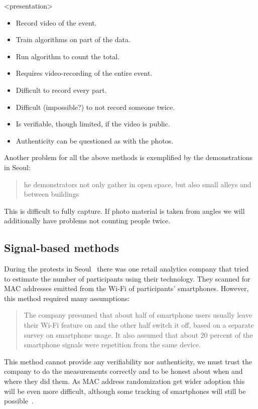 \begin{frame}<presentation>
  \begin{solution}
    \begin{itemize}
      \item Record video of the event.
      \item Train algorithms on part of the data.
      \item Run algorithm to count the total.
    \end{itemize}
  \end{solution}

  \pause

  \begin{remark}
    \begin{itemize}
      \item Requires video-recording of the entire event.
      \item Difficult to record every part.
      \item Difficult (impossible?) to not record someone twice.
      \item Is verifiable, though limited, if the video is public.
      \item Authenticity can be questioned as with the photos.
    \end{itemize}
  \end{remark}
\end{frame}

Another problem for all the above methods is exemplified by the demonstrations 
in Seoul:
\blockcquote{2016DemonstrationsInSeoul}{%
  he demonstrators not only gather in open space, but also small 
  alleys and between buildings%
}.
This is difficult to fully capture.
If photo material is taken from angles we will additionally have problems not 
counting people twice.

\subsection<presentation>{Signal-based methods}

During the protests in Seoul~\cite{2016DemonstrationsInSeoul} there was one 
retail analytics company that tried to estimate the number of participants 
using their technology.
They scanned for MAC addresses emitted from the Wi-Fi of participants' 
smartphones.
However, this method required many assumptions:
\blockcquote{2016DemonstrationsInSeoul}{%
  The company presumed that about half of smartphone users usually leave their 
  Wi-Fi feature on and the other half switch it off, based on a separate survey 
  on smartphone usage. It also assumed that about 20 percent of the smartphone 
  signals were repetition from the same device.
}
This method cannot provide any verifiability nor authenticity, we must trust 
the company to do the measurements correctly and to be honest about when and 
where they did them.
As MAC address randomization get wider adoption this will be even more 
difficult, although some tracking of smartphones will still be 
possible~\cite{WhyMACRandomizationIsNotEnough}.

